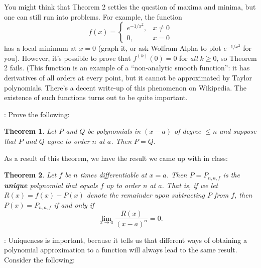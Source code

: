 \documentclass[letterpaper,12pt]{article}
\newtheorem{theorem}{Theorem}
\begin{document}
You might think that Theorem 2 settles the question of maxima and minima, but one can still run into problems. For example, the function
\[
 f(x) = \begin{cases} e^{-1/x^2}, & x\neq 0\\ 0, & x=0\end{cases}
\]
has a local minimum at $x=0$ (graph it, or ask Wolfram Alpha to plot $e^{-1/x^2}$ for you). However, it's possible to prove that $f^{(k)}(0)=0$ for {\em all} $k\geq 0$, so Theorem 2 fails. (This function is an example of a ``non-analytic smooth function'': it has derivatives of all orders at every point, but it cannot be approximated by Taylor polynomials. There's a decent write-up of this phenomenon on Wikipedia. The existence of such functions turns out to be quite important.

: Prove the following:
\begin{theorem}
 Let $P$ and $Q$ be polynomials in $(x-a)$ of degree $\leq n$ and suppose that $P$ and $Q$ agree to order $n$ at $a$. Then $P=Q$.
\end{theorem}
As a result of this theorem, we have the result we came up with in class:
\begin{theorem}
 Let $f$ be $n$ times differentiable at $x=a$. Then $P=P_{n,a,f}$ is the {\bf unique} polynomial that equals $f$ up to order $n$ at $a$. That is, if we let $R(x)=f(x)-P(x)$ denote the remainder upon subtracting $P$ from $f$, then $P(x)=P_{n,a,f}$ if and only if
\[
 \lim_{x\to a}\frac{R(x)}{(x-a)^n}=0.
\]
\end{theorem}
: Uniqueness is important, because it tells us that different ways of obtaining a polynomial approximation to a function will always lead to the same result. Consider the following:
\end{document}

